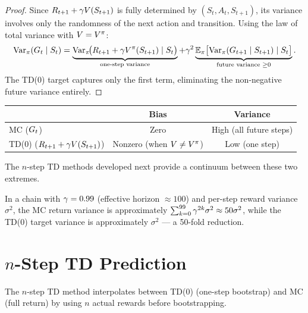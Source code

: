 \documentclass[11pt,a4paper]{article}
\begin{document}
\begin{proof}
Since $R_{t+1} + \gamma V(S_{t+1})$ is fully determined by
$(S_t, A_t, S_{t+1})$, its variance involves only the randomness of
the next action and transition. Using the law of total variance with
$V = V^{\pi}$:
\begin{equation}
  \operatorname{Var}_\pi(G_t \mid S_t)
  = \underbrace{\operatorname{Var}_\pi\!\bigl(R_{t+1} + \gamma V^{\pi}(S_{t+1})
    \mid S_t\bigr)}_{\text{one-step variance}}
  + \gamma^2 \underbrace{\mathbb{E}_\pi\bigl[\operatorname{Var}_\pi(G_{t+1}
    \mid S_{t+1}) \mid S_t\bigr]}_{\text{future variance } \geq 0}.
  \label{eq:variance_decomp}
\end{equation}
The TD(0) target captures only the first term, eliminating the
non-negative future variance entirely.
\end{proof}

\begin{keyresult}[title={Bias--Variance Tradeoff: MC vs TD(0)}]
\begin{center}
\begin{tabular}{lcc}
\toprule
& \textbf{Bias} & \textbf{Variance} \\
\midrule
MC ($G_t$) & Zero & High (all future steps) \\
TD(0) ($R_{t+1} + \gamma V(S_{t+1})$)
  & Nonzero (when $V \neq V^{\pi}$) & Low (one step) \\
\bottomrule
\end{tabular}
\end{center}
The $n$-step TD methods developed next provide a continuum between
these two extremes.
\end{keyresult}

\begin{example}
\label{ex:variance}
In a chain with $\gamma = 0.99$ (effective horizon $\approx 100$)
and per-step reward variance $\sigma^2$, the MC return variance is
approximately $\sum_{k=0}^{99} \gamma^{2k}\sigma^2 \approx
50\sigma^2$, while the TD(0) target variance is approximately
$\sigma^2$ --- a 50-fold reduction.
\end{example}

\section{$n$-Step TD Prediction}
\label{sec:nstep}

The $n$-step TD method interpolates between TD(0) (one-step bootstrap)
and MC (full return) by using $n$ actual rewards before bootstrapping.
\end{document}
